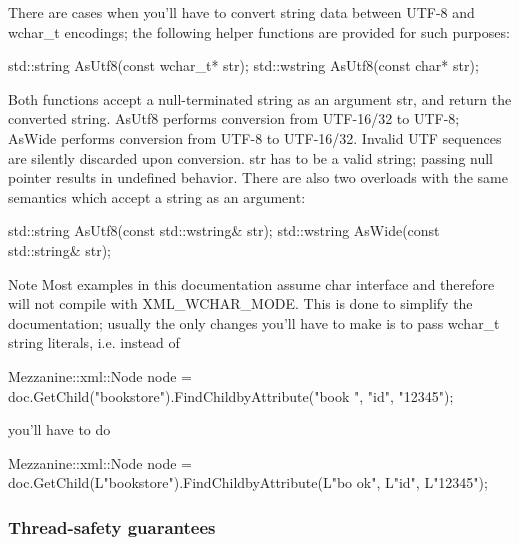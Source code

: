  \par
 There are cases when you'll have to convert string data between UTF-\/8 and wchar\_\-t encodings; the following helper functions are provided for such purposes: 
\begin{DoxyCode}
 std::string AsUtf8(const wchar_t* str);
 std::wstring AsUtf8(const char* str);
\end{DoxyCode}
 Both functions accept a null-\/terminated string as an argument str, and return the converted string. AsUtf8 performs conversion from UTF-\/16/32 to UTF-\/8; AsWide performs conversion from UTF-\/8 to UTF-\/16/32. Invalid UTF sequences are silently discarded upon conversion. str has to be a valid string; passing null pointer results in undefined behavior. There are also two overloads with the same semantics which accept a string as an argument: 
\begin{DoxyCode}
 std::string AsUtf8(const std::wstring& str);
 std::wstring AsWide(const std::string& str);
\end{DoxyCode}
 \begin{DoxyNote}{Note}
Most examples in this documentation assume char interface and therefore will not compile with XML\_\-WCHAR\_\-MODE. This is done to simplify the documentation; usually the only changes you'll have to make is to pass wchar\_\-t string literals, i.e. instead of \par
 \par
 
\begin{DoxyCode}
 Mezzanine::xml::Node node = doc.GetChild("bookstore").FindChildbyAttribute("book
      ", "id", "12345"); 
\end{DoxyCode}
 \par
 \par
 you'll have to do \par
 \par
 
\begin{DoxyCode}
 Mezzanine::xml::Node node = doc.GetChild(L"bookstore").FindChildbyAttribute(L"bo
      ok", L"id", L"12345"); 
\end{DoxyCode}
 \par
 \par
 
\end{DoxyNote}
\hypertarget{XMLManual_XMLThreadSafety}{}\subsubsection{Thread-\/safety guarantees}\label{XMLManual_XMLThreadSafety}
